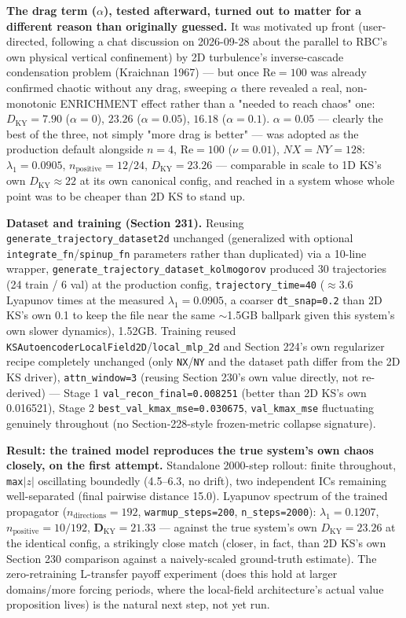 \documentclass[11pt]{article}
\begin{document}
\textbf{The drag term ($\alpha$), tested afterward, turned out to matter
for a different reason than originally guessed.} It was motivated
up front (user-directed, following a chat discussion on 2026-09-28
about the parallel to RBC's own physical vertical confinement) by 2D
turbulence's inverse-cascade condensation problem (Kraichnan 1967) ---
but once $\mathrm{Re}=100$ was already confirmed chaotic without any
drag, sweeping $\alpha$ there revealed a real, non-monotonic ENRICHMENT
effect rather than a "needed to reach chaos" one: $D_{\mathrm{KY}}=7.90$
($\alpha=0$), $\mathbf{23.26}$ ($\alpha=0.05$), $16.18$ ($\alpha=0.1$).
$\alpha=0.05$ --- clearly the best of the three, not simply "more drag is
better" --- was adopted as the production default alongside $n=4$,
$\mathrm{Re}=100$ ($\nu=0.01$), $NX{=}NY{=}128$: $\lambda_1=0.0905$,
$n_{\mathrm{positive}}=12/24$, $D_{\mathrm{KY}}=23.26$ --- comparable in
scale to 1D KS's own $D_{\mathrm{KY}}\approx22$ at its own canonical
config, and reached in a system whose whole point was to be cheaper than
2D KS to stand up.

\textbf{Dataset and training (Section 231).} Reusing
\texttt{generate\_trajectory\_dataset2d} unchanged (generalized with
optional \texttt{integrate\_fn}/\texttt{spinup\_fn} parameters rather than
duplicated) via a 10-line wrapper,
\texttt{generate\_trajectory\_dataset\_kolmogorov} produced 30
trajectories (24 train / 6 val) at the production config,
\texttt{trajectory\_time=40} ($\approx3.6$ Lyapunov times at the measured
$\lambda_1=0.0905$, a coarser \texttt{dt\_snap=0.2} than 2D KS's own 0.1
to keep the file near the same $\sim$1.5GB ballpark given this system's
own slower dynamics), 1.52GB. Training reused
\texttt{KSAutoencoderLocalField2D}/\texttt{local\_mlp\_2d} and Section
224's own regularizer recipe completely unchanged (only \texttt{NX}/\texttt{NY}
and the dataset path differ from the 2D KS driver), \texttt{attn\_window=3}
(reusing Section 230's own value directly, not re-derived) --- Stage 1
\texttt{val\_recon\_final=0.008251} (better than 2D KS's own 0.016521),
Stage 2 \texttt{best\_val\_kmax\_mse=0.030675}, \texttt{val\_kmax\_mse}
fluctuating genuinely throughout (no Section-228-style frozen-metric
collapse signature).

\textbf{Result: the trained model reproduces the true system's own
chaos closely, on the first attempt.} Standalone 2000-step rollout:
finite throughout, \texttt{max}$|z|$ oscillating boundedly (4.5--6.3, no
drift), two independent ICs remaining well-separated (final pairwise
distance 15.0). Lyapunov spectrum of the trained propagator
($n_{\mathrm{directions}}{=}192$, \texttt{warmup\_steps=200},
\texttt{n\_steps=2000}): $\lambda_1=0.1207$, $n_{\mathrm{positive}}=10/192$,
$\boldsymbol{D_{\mathrm{KY}}=21.33}$ --- against the true system's own
$D_{\mathrm{KY}}=23.26$ at the identical config, a strikingly close match
(closer, in fact, than 2D KS's own Section 230 comparison against a
naively-scaled ground-truth estimate). The zero-retraining L-transfer
payoff experiment (does this hold at larger domains/more forcing periods,
where the local-field architecture's actual value proposition lives) is
the natural next step, not yet run.
\end{document}
